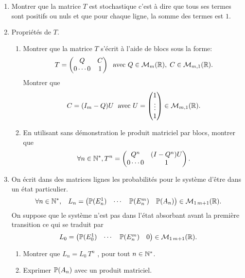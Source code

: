 \begin{enumerate}
  \item Montrer que la matrice $T$ est stochastique c'est à dire que tous ses termes sont positifs ou nuls et que pour chaque ligne, la somme des termes est $1$.
  
  \item Propriétés de $T$.
  \begin{enumerate}
    \item Montrer que la matrice $T$ s'écrit à l'aide de blocs sous la forme:
\[
  T = 
  \begin{pmatrix}
    Q & C \\ 0 \cdots 0 & 1
  \end{pmatrix}
  \; \text{ avec } Q\in \mathcal{M}_{m}(\mathbb{R}), \;C \in \mathcal{M}_{m,1}(\mathbb{R}).
\]
Montrer que 
\[
  C = (I_m - Q)U\; \text{ avec }
  U =
    \begin{pmatrix}
      1 \\ \vdots \\ 1
    \end{pmatrix}   \in \mathcal{M}_{m,1}(\mathbb{R}) .
\]

    \item En utilisant sans démonstration le produit matriciel par blocs, montrer que 
\[
  \forall n\in \mathbb{N}^*, T^n =
  \begin{pmatrix}
    Q ^n       & (I - Q^n)U \\ 
    0 \cdots 0 & 1
  \end{pmatrix}
.
\]
  \end{enumerate}

  \item On écrit dans des matrices lignes les probabilités pour le système d'être dans un état particulier. 
\[
  \forall n \in \mathbb{N}^*, \hspace{0.3cm}
     L_n = \begin{pmatrix} \mathbb{P}(E_n^1) & \cdots & \mathbb{P}(E_n^m) & \mathbb{P}(A_n)\end{pmatrix} \in \mathcal{M}_{1\, m+1}(\mathbb{R}). 
\]
On suppose que le système n'est pas dans l'état absorbant avant la première transition ce qui se traduit par 
\[
  L_0 = \begin{pmatrix} \mathbb{P}(E_0^1)  & \cdots & \mathbb{P}(E_n^m) & 0 \end{pmatrix} \in \mathcal{M}_{1\, m+1}(\mathbb{R}).
\]
  \begin{enumerate}
    \item Montrer que $L_n = L_0\, T^n$ , pour tout $n\in \mathbb{N}^*$.
    \item Exprimer $\mathbb{P}(A_n)$ avec un produit matriciel.
  \end{enumerate}


\end{enumerate}
